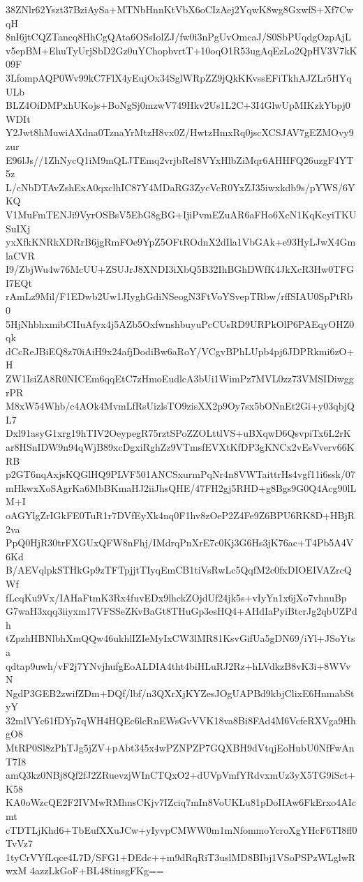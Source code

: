 38ZNlr62Yszt37BziAySa+MTNbHnnKtVbX6oCIzAej2YqwK8wg8GxwfS+Xf7CwqH
8nI6jtCQZTancq8HhCgQAta6OSsIolZJ/fw0i3nPgUvOmcaJ/S0SbPUqdgOzpAjL
v5epBM+EhuTyUrjSbD2Gz0uYChopbvrtT+10oqO1R53ugAqEzLo2QpHV3V7kK09F
3LfompAQP0Wv99kC7FlX4yEujOx34SglWRpZZ9jQkKKvssEFiTkhAJZLr5HYqULb
BLZ4OiDMPxhUKojs+BoNgSj0mzwV749Hkv2Us1L2C+3I4GlwUpMIKzkYbpj0WDIt
Y2Jwt8hMuwiAXdna0TznaYrMtzH8vx0Z/HwtzHmxRq0jscXCSJAV7gEZMOvy9zur
E96lJs//1ZhNycQ1iM9mQLJTEmq2vrjbReI8VYxHlbZiMqr6AHHFQ26uzgF4YT5z
L/cNbDTAvZshExA0qxclhIC87Y4MDaRG3ZycVcR0YxZJ35iwxkdb9s/pYWS/6YKQ
V1MuFmTENJi9VyrOSBsV5EbG8gBG+IjiPvmEZuAR6aFHo6XcN1KqKcyiTKUSuIXj
yxXfkKNRkXDRrB6jgRmFOe9YpZ5OFtROdnX2dIla1VbGAk+e93HyLJwX4GmlaCVR
I9/ZbjWu4w76McUU+ZSUJrJ8XNDI3iXbQ5B32IhBGhDWfK4JkXcR3Hw0TFGI7EQt
rAmLz9Mil/F1EDwb2Uw1JIyghGdiNSeogN3FtVoYSvepTRbw/rffSIAU0SpPtRb0
5HjNhbhxmibCIIuAfyx4j5AZb5OxfwnshbuyuPcCUsRD9URPkOlP6PAEqyOHZ0qk
dCcReJBiEQ8z70iAiH9x24afjDodiBw6aRoY/VCgvBPhLUpb4pj6JDPRkmi6zO+H
ZW1IsiZA8R0NICEm6qqEtC7zHmoEudlcA3bUi1WimPz7MVL0zz73VMSIDiwggrPR
M8xW54Whb/c4AOk4MvmLfRsUizlsTO9zisXX2p9Oy7sx5bONnEt2Gi+y03qbjQL7
Dxl91asyG1xrg19hTIV2OeypegR75rztSPoZZOLttlVS+uBXqwD6QsvpiTx6L2rK
ar8HSnIDW9n94qWjB89xcDgxiRghZz9VTmsfEVXtKfDP3gKNCx2vEsVverv66KRB
p2GT6nqAxjsKQGlHQ9PLVF501ANCSxurmPqNr4n8VWTaittrHs4vgf11i6ssk/07
mHkwxXoSAgrKa6MbBKmaHJ2iiJhsQHE/47FH2gj5RHD+g8Bgs9G0Q4Acg90lLM+I
oAGYlgZrIGkFE0TuR1r7DVfEyXk4nq0F1hv8zOeP2Z4Fe9Z6BPU6RK8D+HBjR2va
PpQ0HjR30trFXGUxQFW8nFhj/IMdrqPnXrE7c0Kj3G6Hs3jK76ac+T4Pb5A4V6Kd
B/AEVqlpkSTHkGp9zTFTpjjtTIyqEmCB1tiVsRwLc5QqfM2c0fxDIOEIVAZrcQWf
fLcqKu9Vx/IAHaFtmK3Rx4fuvEDx9lhckZOjdUf24jk5s+vIyYn1x6jXo7vhnuBp
G7waH3xqq3iiyxm17VFSSeZKvBaGt8THuGp3esHQ4+AHdIaPyiBtcrJg2qbUZPdh
tZpzhHBNlbhXmQQw46ukhlIZIeMyIxCW3lMR81KsvGifUa5gDN69/iYl+JSoYtsa
qdtap9uwh/vF2j7YNvjhufgEoALDIA4tht4biHLuRJ2Rz+hLVdkzB8vK3i+8WVvN
NgdP3GEB2zwifZDm+DQf/lbf/n3QXrXjKYZesJOgUAPBd9kbjClixE6HnmabStyY
32mlVYc61fDYp7qWH4HQEc6lcRnEWsGvVVK18va8Bi8FAd4M6VcfeRXVga9HhgO8
MtRP0Sl8zPhTJg5jZV+pAbt345x4wPZNPZP7GQXBH9dVtqjEoHubU0NfFwAnT7I8
amQ3kz0NBj8Qf2fJ2ZRuevzjWInCTQxO2+dUVpVmfYRdvxmUz3yX5TG9iSct+K58
KA0oWzcQE2F2IVMwRMhnsCKjv7IZciq7mIn8VoUKLu81pDoIIAw6FkErxo4AIcmt
cTDTLjKhd6+TbEufXXuJCw+yIyvpCMWW0m1mNfommoYcroXgYHcF6TI8ff0TvVz7
1tyCrVYfLqce4L7D/SFG1+DEdc++m9dRqRiT3uslMD8BIbj1VSoPSPzWLglwRwxM
4azzLkGoF+BL48tinsgFKg==
